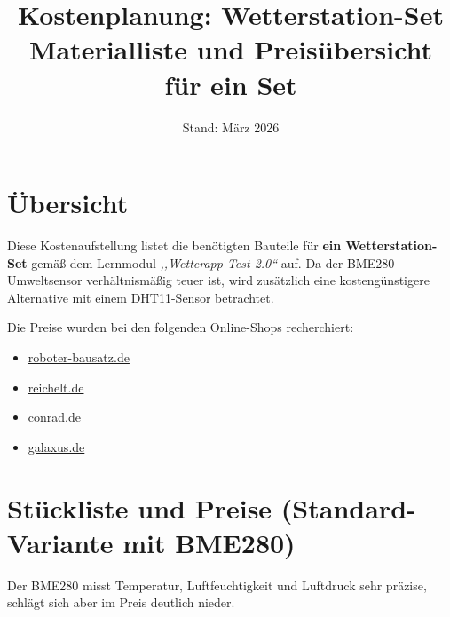 \documentclass[a4paper,12pt]{article}
\title{%
  \vspace{-1.5cm}
  Kostenplanung: Wetterstation-Set\\[6pt]
  \large Materialliste und Preisübersicht für ein Set
}
\date{Stand: März 2026}
\begin{document}
\maketitle

\section*{Übersicht}
Diese Kostenaufstellung listet die benötigten Bauteile für \textbf{ein Wetterstation-Set} gemäß dem Lernmodul \emph{,,Wetterapp-Test 2.0``} auf. Da der BME280-Umweltsensor verhältnismäßig teuer ist, wird zusätzlich eine kostengünstigere Alternative mit einem DHT11-Sensor betrachtet.

Die Preise wurden bei den folgenden Online-Shops recherchiert:
\begin{itemize}
  \item \href{https://www.roboter-bausatz.de}{roboter-bausatz.de}
  \item \href{https://www.reichelt.de}{reichelt.de}
  \item \href{https://www.conrad.de}{conrad.de}
  \item \href{https://www.galaxus.de}{galaxus.de}
\end{itemize}

\noindent

\section{Stückliste und Preise (Standard-Variante mit BME280)}
Der BME280 misst Temperatur, Luftfeuchtigkeit und Luftdruck sehr präzise, schlägt sich aber im Preis deutlich nieder.
\end{document}
